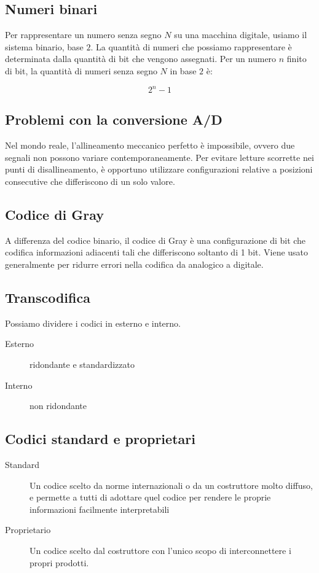 \documentclass{article}
\begin{document}
\subsection{Numeri binari}

Per rappresentare un numero senza segno $N$ su una macchina digitale, usiamo il sistema binario, base $2$.
La quantità di numeri che possiamo rappresentare è determinata dalla quantità di bit che vengono assegnati.
Per un numero $n$ finito di bit, la quantità di numeri senza segno $N$ in base $2$ è:

$$
2^n - 1
$$

\subsection{Problemi con la conversione A/D}

Nel mondo reale, l'allineamento meccanico perfetto è impossibile, ovvero due segnali non possono variare contemporaneamente.
Per evitare letture scorrette nei punti di disallineamento, è opportuno utilizzare configurazioni relative a posizioni consecutive che differiscono di un solo valore.

\subsection{Codice di Gray}

A differenza del codice binario, il codice di Gray è una configurazione di bit che codifica informazioni adiacenti tali che differiscono soltanto di 1 bit.
Viene usato generalmente per ridurre errori nella codifica da analogico a digitale.

\subsection{Transcodifica}

Possiamo dividere i codici in esterno e interno.

\begin{description}
	\item[Esterno] ridondante e standardizzato
	\item[Interno] non ridondante
\end{description}

\subsection{Codici standard e proprietari}

\begin{description}
    \item[Standard] Un codice scelto da norme internazionali o da un costruttore molto diffuso, e permette a tutti di adottare quel codice per rendere le proprie informazioni facilmente interpretabili
    \item[Proprietario] Un codice scelto dal costruttore con l'unico scopo di interconnettere i propri prodotti.
\end{description}
\end{document}
